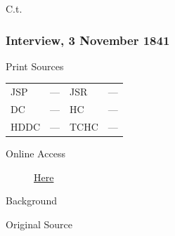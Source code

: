 				C.t.
				
		\subsubsection{Interview, 3 November 1841}
			\label{EMS-1841-JS-3-NOV-1841}
				
			\begin{description}
				\item[Print Sources]
			\end{description}	

			\begin{tabular}{p{0.5in}p{1in}p{0.5in}p{1in}}
				JSP	 	& ---		& JSR 		& --- \\
				DC	 	& ---		& HC 		& --- \\
				HDDC 	& ---		& TCHC 		& --- \\
			\end{tabular}
			
			\begin{description}
				\item[Online Access] \href{https://www.josephsmithpapers.org/paper-summary/interview-3november-1841/1}{Here}
			\end{description}
			
			\begin{description}
				\item[Background]
			\end{description}
			
			
			\begin{description}
				\item[Original Source]
			\end{description}
			
			

